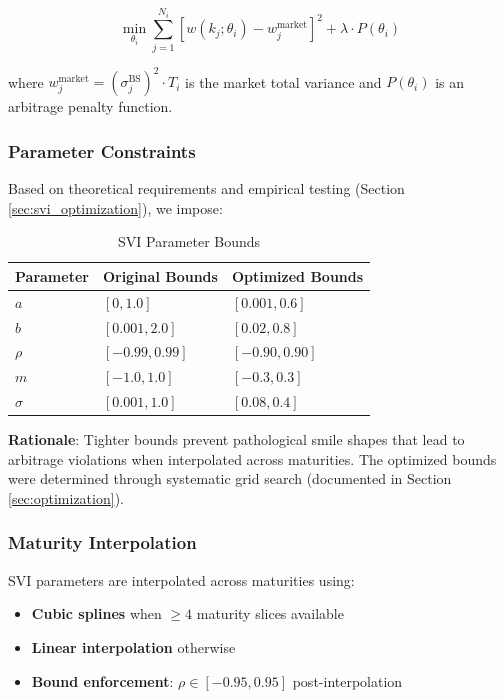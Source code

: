 \documentclass[12pt,a4paper]{article}
\begin{document}
\begin{equation}
    \min_{\theta_i} \sum_{j=1}^{N_i} \left[w(k_j; \theta_i) - w_j^{\text{market}}\right]^2 + \lambda \cdot P(\theta_i)
\end{equation}

where $w_j^{\text{market}} = (\sigma_j^{\text{BS}})^2 \cdot T_i$ is the market total variance and $P(\theta_i)$ is an arbitrage penalty function.

\subsubsection{Parameter Constraints}

Based on theoretical requirements and empirical testing (Section \ref{sec:svi_optimization}), we impose:

\begin{table}[h]
\centering
\caption{SVI Parameter Bounds}
\begin{tabular}{lll}
\toprule
\textbf{Parameter} & \textbf{Original Bounds} & \textbf{Optimized Bounds} \\
\midrule
$a$ & $[0, 1.0]$ & $[0.001, 0.6]$ \\
$b$ & $[0.001, 2.0]$ & $[0.02, 0.8]$ \\
$\rho$ & $[-0.99, 0.99]$ & $[-0.90, 0.90]$ \\
$m$ & $[-1.0, 1.0]$ & $[-0.3, 0.3]$ \\
$\sigma$ & $[0.001, 1.0]$ & $[0.08, 0.4]$ \\
\bottomrule
\end{tabular}
\end{table}

\textbf{Rationale}: Tighter bounds prevent pathological smile shapes that lead to arbitrage violations when interpolated across maturities. The optimized bounds were determined through systematic grid search (documented in Section \ref{sec:optimization}).

\subsubsection{Maturity Interpolation}

SVI parameters are interpolated across maturities using:
\begin{itemize}
    \item \textbf{Cubic splines} when $\geq 4$ maturity slices available
    \item \textbf{Linear interpolation} otherwise
    \item \textbf{Bound enforcement}: $\rho \in [-0.95, 0.95]$ post-interpolation
\end{itemize}
\end{document}

